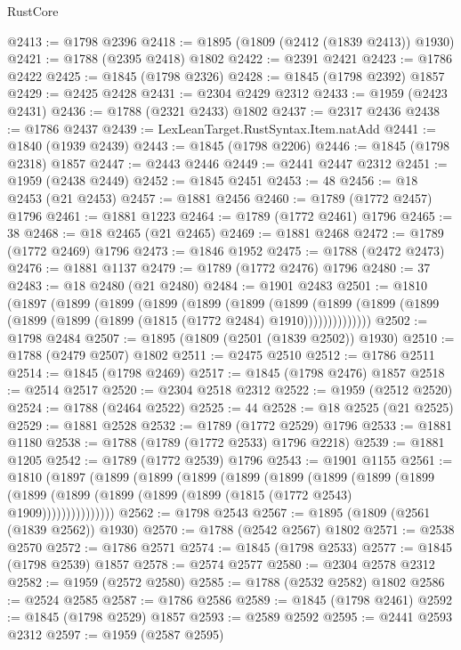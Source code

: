 \begin{lexlean}{RustCore}
\begin{coremodule}
@2413 := @1798 @2396
@2418 := @1895 (@1809 (@2412 (@1839 @2413)) @1930)
@2421 := @1788 (@2395 @2418) @1802
@2422 := @2391 @2421
@2423 := @1786 @2422
@2425 := @1845 (@1798 @2326)
@2428 := @1845 (@1798 @2392) @1857
@2429 := @2425 @2428
@2431 := @2304 @2429 @2312
@2433 := @1959 (@2423 @2431)
@2436 := @1788 (@2321 @2433) @1802
@2437 := @2317 @2436
@2438 := @1786 @2437
@2439 := LexLeanTarget.RustSyntax.Item.natAdd
@2441 := @1840 (@1939 @2439)
@2443 := @1845 (@1798 @2206)
@2446 := @1845 (@1798 @2318) @1857
@2447 := @2443 @2446
@2449 := @2441 @2447 @2312
@2451 := @1959 (@2438 @2449)
@2452 := @1845 @2451
@2453 := 48
@2456 := @18 @2453 (@21 @2453)
@2457 := @1881 @2456
@2460 := @1789 (@1772 @2457) @1796
@2461 := @1881 @1223
@2464 := @1789 (@1772 @2461) @1796
@2465 := 38
@2468 := @18 @2465 (@21 @2465)
@2469 := @1881 @2468
@2472 := @1789 (@1772 @2469) @1796
@2473 := @1846 @1952
@2475 := @1788 (@2472 @2473)
@2476 := @1881 @1137
@2479 := @1789 (@1772 @2476) @1796
@2480 := 37
@2483 := @18 @2480 (@21 @2480)
@2484 := @1901 @2483
@2501 := @1810
    (@1897
      (@1899
        (@1899
          (@1899
            (@1899
              (@1899
                (@1899
                  (@1899 (@1899 (@1899 (@1899 (@1899 (@1899 (@1815 (@1772 @2484) @1910))))))))))))))
@2502 := @1798 @2484
@2507 := @1895 (@1809 (@2501 (@1839 @2502)) @1930)
@2510 := @1788 (@2479 @2507) @1802
@2511 := @2475 @2510
@2512 := @1786 @2511
@2514 := @1845 (@1798 @2469)
@2517 := @1845 (@1798 @2476) @1857
@2518 := @2514 @2517
@2520 := @2304 @2518 @2312
@2522 := @1959 (@2512 @2520)
@2524 := @1788 (@2464 @2522)
@2525 := 44
@2528 := @18 @2525 (@21 @2525)
@2529 := @1881 @2528
@2532 := @1789 (@1772 @2529) @1796
@2533 := @1881 @1180
@2538 := @1788 (@1789 (@1772 @2533) @1796 @2218)
@2539 := @1881 @1205
@2542 := @1789 (@1772 @2539) @1796
@2543 := @1901 @1155
@2561 := @1810
    (@1897
      (@1899
        (@1899
          (@1899
            (@1899
              (@1899
                (@1899
                  (@1899
                    (@1899
                      (@1899 (@1899 (@1899 (@1899 (@1899 (@1815 (@1772 @2543) @1909)))))))))))))))
@2562 := @1798 @2543
@2567 := @1895 (@1809 (@2561 (@1839 @2562)) @1930)
@2570 := @1788 (@2542 @2567) @1802
@2571 := @2538 @2570
@2572 := @1786 @2571
@2574 := @1845 (@1798 @2533)
@2577 := @1845 (@1798 @2539) @1857
@2578 := @2574 @2577
@2580 := @2304 @2578 @2312
@2582 := @1959 (@2572 @2580)
@2585 := @1788 (@2532 @2582) @1802
@2586 := @2524 @2585
@2587 := @1786 @2586
@2589 := @1845 (@1798 @2461)
@2592 := @1845 (@1798 @2529) @1857
@2593 := @2589 @2592
@2595 := @2441 @2593 @2312
@2597 := @1959 (@2587 @2595)

\end{coremodule}
\end{lexlean}

